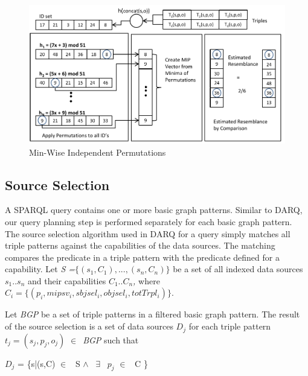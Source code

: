 \documentclass{sig-alternate}  %
\begin{document}
\begin{figure}
\begin{centering}
\includegraphics[scale=0.53]{img/mips} 
\par\end{centering}

\caption{Min-Wise Independent Permutations}
\end{figure}

\subsection{Source Selection}
A SPARQL query contains one or more basic graph patterns. Similar to DARQ, our query planning
step is performed separately for each basic graph pattern.
The source selection algorithm used in DARQ for
a query simply matches all triple patterns against the capabilities
of the data sources. The matching compares the predicate in a triple
pattern with the predicate defined for a capability. Let \emph{S =$\{(s_1,C_1),...,(s_n,C_n)\}$ } be a set of all indexed data sources \emph{$s_1..s_n$} and their capabilities \emph{$C_1..C_n$,} where \emph{$C_i = \{(p_i,mipsv_i,sbjsel_i,objsel_i,totTrpl_i)\}$}.

Let \emph{BGP} be a set of triple
patterns in a filtered basic graph pattern. The result of the source
selection is a set of data sources $D_j$ for each triple
pattern $t_j = (s_j, p_j, o_j)$ $\in$\ \emph{BGP} such that 

\begin{center}
$D_j$ = \{s|(s,C) $\in$ \ S $\wedge$ \ $\exists$
\ $p_j$ $\in$ \ C \}
\par\end{center}
\end{document}
